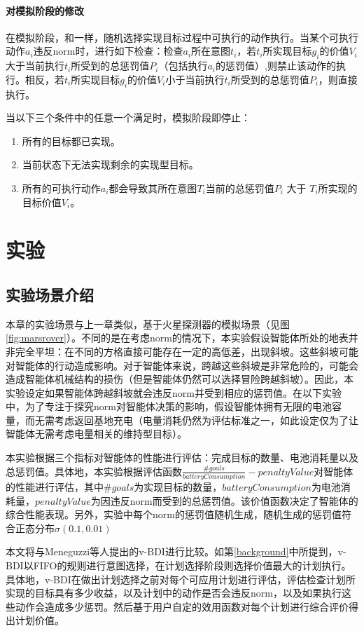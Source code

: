 \paragraph{对模拟阶段的修改}
在模拟阶段，\SAN 和\SA 一样，随机选择实现目标过程中可执行的动作执行。当某个可执行动作$a_i$违反norm时，进行如下检查：检查$a_i$所在意图$t_i$，若$t_i$所实现目标$g_i$的价值$V_i$大于当前执行$t_i$所受到的总惩罚值$P_i$（包括执行$a_i$的惩罚值）,则禁止该动作的执行。相反，若$t_i$所实现目标$g_i$的价值$V_i$小于当前执行$t_i$所受到的总惩罚值$P_i$，则直接执行。

当以下三个条件中的任意一个满足时，模拟阶段即停止：
\begin{enumerate}
  \item 所有的目标都已实现。
  \item 当前状态下无法实现剩余的实现型目标。
  \item 所有的可执行动作$a_i$都会导致其所在意图$T_i$当前的总惩罚值$P_i$ 大于 $T_i$所实现的目标价值$V_i$。
\end{enumerate}

\section{实验}
\subsection{实验场景介绍}
本章的实验场景与上一章类似，基于火星探测器的模拟场景（见图\ref{fig:marsrover}）。不同的是在考虑norm的情况下，本实验假设智能体所处的地表并非完全平坦：在不同的方格直接可能存在一定的高低差，出现斜坡。这些斜坡可能对智能体的行动造成影响。对于智能体来说，跨越这些斜坡是非常危险的，可能会造成智能体机械结构的损伤（但是智能体仍然可以选择冒险跨越斜坡）。因此，本实验设定如果智能体跨越斜坡就会违反norm并受到相应的惩罚值。在以下实验中，为了专注于探究norm对智能体决策的影响，假设智能体拥有无限的电池容量，而无需考虑返回基地充电（电量消耗仍然为评估标准之一，如此设定仅为了让智能体无需考虑电量相关的维持型目标）。

本实验根据三个指标对智能体的性能进行评估：完成目标的数量、电池消耗量以及总惩罚值。具体地，本实验根据评估函数$\frac{\#goals}{batteryConsumption} - penaltyValue$对智能体的性能进行评估，其中$\#goals$为实现目标的数量，$batteryConsumption$为电池消耗量，$penaltyValue$为因违反norm而受到的总惩罚值。该价值函数决定了智能体的综合性能表现。另外，实验中每个norm的惩罚值随机生成，随机生成的惩罚值符合正态分布$\sigma(0.1, 0.01)$

本文将\SAN 与Meneguzzi等人提出的v-BDI\cite{DBLP:journals/eaai/MeneguzziROVL15}进行比较。如第\ref{background}中所提到，v-BDI以FIFO的规则进行意图选择，在计划选择阶段则选择价值最大的计划执行。具体地，v-BDI在做出计划选择之前对每个可应用计划进行评估，评估检查计划所实现的目标具有多少收益，以及计划中的动作是否会违反norm，以及如果执行这些动作会造成多少惩罚。然后基于用户自定的效用函数对每个计划进行综合评价得出计划价值。

